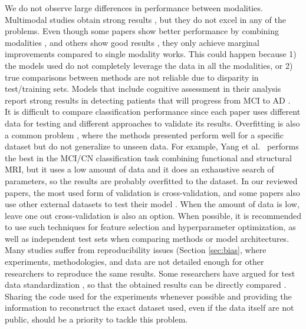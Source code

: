 We do not observe large differences in performance between modalities. Multimodal studies obtain strong results \cite{Chen2015,Hinrichs2011,Minhas2016,Minhas2018}, but they do not excel in any of the problems. Even though some papers show better performance by combining modalities \cite{Hinrichs2011}, and others show good results \cite{Ardekani2016,Chi2017,Minhas2016,Minhas2018}, they only achieve marginal improvements compared to single modality works. This could happen because 1) the models used do not completely leverage the data in all the modalities, or 2) true comparisons between methods are not reliable due to disparity in test/training sets. Models that include cognitive assessment in their analysis report strong results in detecting patients that will progress from MCI to AD \cite{Chen2015,Thung2018,Aghili2018,Minhas2016,Minhas2018,Ardekani2016,Mubeen2017}. \\


It is difficult to compare classification performance since each paper uses different data for testing and different approaches to validate its results. Overfitting is also a common problem \cite{cuingnet,Mendelson2017}, where the methods presented perform well for a specific dataset but do not generalize to unseen data. For example, Yang et al.\ \cite{Yang2018} performs the best in the MCI/CN classification task combining functional and structural MRI, but it uses a low amount of data and it does an exhaustive search of parameters, so the results are probably overfitted to the dataset. In our reviewed papers, the most used form of validation is cross-validation, and some papers also use other external datasets to test their model \cite{Aksman2016,Platero2019}. When the amount of data is low, leave one out cross-validation is also an option. When possible, it is recommended to use such techniques for feature selection and hyperparameter optimization, as well as independent test sets when comparing methods or model architectures. \\

Many studies suffer from reproducibility issues (Section \ref{sec:bias}, where experiments, methodologies, and data are not detailed enough for other researchers to reproduce the same results. Some researchers have argued for test data standardization \cite{cuingnet,Samper-Gonzalez2018,Wyman2013}, so that the obtained results can be directly compared \cite{Minhas2016,Minhas2018,Sanroma2017}. Sharing the code used for the experiments whenever possible and providing the information to reconstruct the exact dataset used, even if the data itself are not public, should be a priority to tackle this problem. \\

